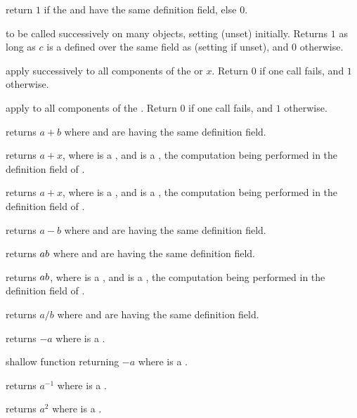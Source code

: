  return $1$ if the   and
 have the same definition field, else $0$.

 to be called successively on many objects,
setting  (unset) initially. Returns $1$ as long as $c$ is a
 defined over the same field as  (setting 
if unset), and $0$ otherwise.

 apply  successively to all
components of the  or  $x$. Return $0$ if one call fails,
and $1$ otherwise.

 apply  to all components
of the . Return $0$ if one call fails, and $1$ otherwise.

 returns $a+b$ where  and  are
 having the same definition field.

 returns $a+x$, where  is a
, and  is a , the computation being
performed in the definition field of .

 returns $a+x$, where  is a
, and  is a , the computation being
performed in the definition field of .

 returns $a-b$ where  and  are
 having the same definition field.

 returns $a\*b$ where  and  are
 having the same definition field.

 returns $a\*b$, where  is a
, and  is a , the computation being
performed in the definition field of .

 returns $a/b$ where  and  are
 having the same definition field.

 returns $-a$ where  is a .

 shallow function returning $-a$ where  is a
.

 returns $a^{-1}$ where  is a .

 returns $a^2$ where  is a .

